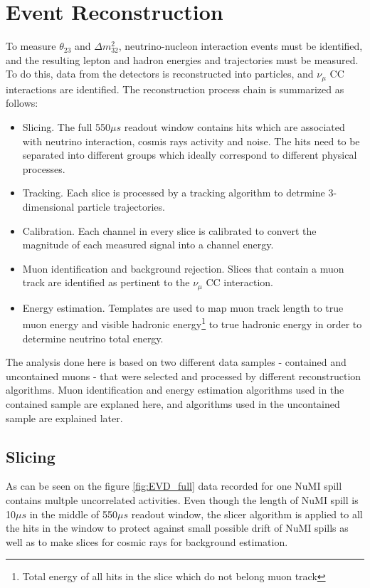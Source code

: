 \chapter{Event Reconstruction}
\label{reconstruction_chapter}

To measure $\theta_{23}$ and $\Delta m_{32}^2$, neutrino-nucleon interaction events must be identified, and the
resulting lepton and hadron energies and trajectories must be measured. To do this, data from the
detectors is reconstructed into particles, and $\nu_\mu$ CC interactions are identified. The
reconstruction process chain is summarized as follows:
\begin{itemize}
\item Slicing. The full 550$\mu s$ readout window contains hits which are associated with
neutrino interaction, cosmis rays activity and noise. The hits need to be separated into
different groups which ideally correspond to different physical processes.
\item Tracking.  Each slice is processed by a tracking algorithm to detrmine 3-dimensional particle
trajectories.
\item Calibration. Each channel in every slice is calibrated to convert the magnitude of each
measured signal into a channel energy.
\item Muon identification and background rejection. Slices that contain a muon track are identified
as pertinent to the $\nu_\mu$ CC interaction.
\item Energy estimation. Templates are used to map muon track length to true muon energy and visible 
hadronic energy\footnote{Total energy of all hits in the slice which do not belong muon track} to true 
hadronic energy in order to determine neutrino total energy.  
\end{itemize}
The analysis done here is based on two different data samples - contained and uncontained muons -
that were selected and processed by different reconstruction algorithms. Muon identification and energy
estimation algorithms used in the contained sample are explaned here, and algorithms used in the uncontained
sample are explained later.

\section{Slicing}
As can be seen on the figure \ref{fig:EVD_full} data recorded for one NuMI spill contains
multple uncorrelated activities. Even though the length of NuMI spill is 10$\mu s$ in the middle
of 550$\mu s$ readout window, the slicer algorithm is applied to all the hits in the window to protect 
against small possible drift of NuMI spills as well as to make slices for cosmic rays for background
estimation.

